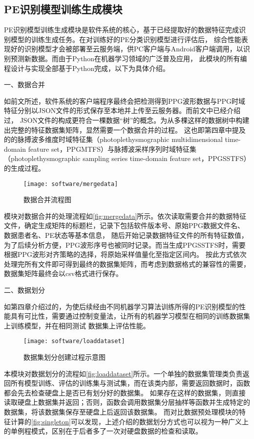 \subsection{PE识别模型训练生成模块}
PE识别模型训练生成模块是软件系统的核心，基于已经提取好的数据特征完成识别模型的训练生成任务。在对训练好的PE分类识别模型进行评估后，
综合性能表现好的识别模型才会被部署至云服务端，供PC客户端与Android客户端调用，以识别预测新数据。而由于Python在机器学习领域的广泛普及应用，
此模块的所有编程设计与实现全部基于Python完成，以下为具体介绍。

一、数据合并

如前文所述，软件系统的客户端程序最终会把检测得到PPG波形数据与PPG时域特征分别以JSON文件的形式保存至本地并上传至云服务器。而前文中已经介绍过，
JSON文件的构成更符合一棵数据“树”的概念。为从多棵这样的数据树中构建出完整的特征数据集矩阵，显然需要一个数据合并的过程。
这也即第四章中提及的的脉搏波多维度时域特征集（photoplethysmographic multidimensional
time-domain feature set，PPGMTFS）与脉搏波采样序列时域特征集（photoplethysmographic sampling series time-domain feature set，PPGSSTFS）的生成过程。
\begin{figure}[htbp]
    \centering
    \texttt{[image: software/mergedata]}
    \caption{\label{fig:mergedata}数据合并流程图}
\end{figure}

模块对数据合并的处理流程如\autoref{fig:mergedata}所示。依次读取需要合并的数据特征文件，确定生成矩阵的标题栏，记录下包括软件版本号、原始PPG数据文件名、数据患者名、PE状态等基本信息，
随后开始记录数据特征文件的所有特征数值，为了后续分析方便，PPG波形序号也被同时记录。而当生成PPGSSTFS时，需要根据PPG波形对齐策略的选择，将原始采样值量化至指定区间内。
按此方式依次处理完所有文件即可得到最终的数据集矩阵，而考虑到数据格式的兼容性的需要，数据集矩阵最终会以csv格式进行保存。

二、数据划分

如第四章介绍过的，为使后续经由不同机器学习算法训练所得的PE识别模型的性能具有可比性，需要通过控制变量法，让所有的机器学习模型在相同的训练数据集上训练模型，并在相同测试
数据集上评估性能。
\begin{figure}[htbp]
    \centering
    \texttt{[image: software/loaddataset]}
    \caption{\label{fig:loaddataset}数据集划分创建过程示意图}
\end{figure}

本模块对数据划分的流程如\autoref{fig:loaddataset}所示。一个单独的数据集管理类负责返回所有模型训练、评估的训练集与测试集，而在该类内部，需要返回数据时，函数都会先去检查硬盘上是否已有划分好的数据集。
如果存在这样的数据集，则直接读取硬盘上数据集并返回；否则，函数会调用数据集分层抽样等函数并生成特定的数据集，将该数据集保存至硬盘上后返回该数据集。
而对比数据预处理模块的特征计算的\autoref{fig:singleton}可以发现，上述介绍的数据划分方式也可以视为一种广义上的单例程模式，区别在于后者多了一次对硬盘数据的检查和读取。

